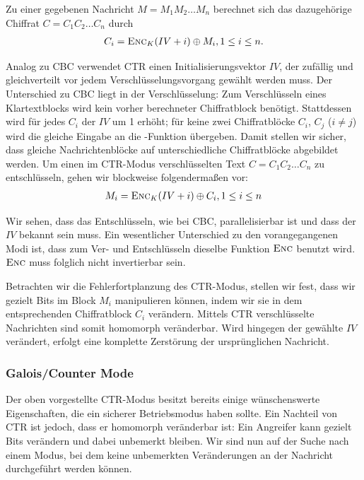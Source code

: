 Zu einer gegebenen Nachricht $M = M_1M_2 \dots M_n$ berechnet sich das dazugehörige Chiffrat $C = C_1C_2 \dots C_n$ durch
\begin{align*}
	C_i = \textsc{Enc}_{K}(IV + i) \oplus M_i{,}\, 1 \leq i \leq n.
\end{align*}

Analog zu CBC verwendet CTR einen Initialisierungsvektor $IV$, der zufällig und gleichverteilt vor jedem Verschlüsselungsvorgang gewählt werden muss. Der Unterschied zu CBC liegt in der Verschlüsselung: Zum Verschlüsseln eines Klartextblocks wird kein vorher berechneter Chiffratblock benötigt. Stattdessen wird für jedes $C_i$ der $IV$ um 1 erhöht; für keine zwei Chiffratblöcke $C_i$, $C_j$ ($i \neq j$) wird die gleiche Eingabe an die \enc-Funktion übergeben. Damit stellen wir sicher, dass gleiche Nachrichtenblöcke auf unterschiedliche Chiffratblöcke abgebildet werden. Um einen im CTR-Modus verschlüsselten Text $C = C_1C_2 \dots C_n$ zu entschlüsseln, gehen wir blockweise folgendermaßen vor:
\begin{align*}
	M_i = \textsc{Enc}_{K}(IV + i) \oplus C_i{,}\, 1 \leq i \leq n
\end{align*}

Wir sehen, dass das Entschlüsseln, wie bei CBC, parallelisierbar ist und dass der $IV$ bekannt sein muss. Ein wesentlicher Unterschied zu den vorangegangenen Modi ist, dass zum Ver- und Entschlüsseln dieselbe Funktion $\textsc{Enc}$ benutzt wird. $\textsc{Enc}$ muss folglich nicht invertierbar sein.

Betrachten wir die Fehlerfortplanzung des CTR-Modus, stellen wir fest, dass wir gezielt Bits im Block $M_i$ manipulieren können, indem wir sie in dem entsprechenden Chiffratblock $C_i$ verändern. Mittels CTR verschlüsselte Nachrichten sind somit homomorph veränderbar. Wird hingegen der gewählte $IV$ verändert, erfolgt eine komplette Zerstörung der ursprünglichen Nachricht. 

\subsubsection{Galois/Counter Mode}
Der oben vorgestellte CTR-Modus besitzt bereits einige wünschenswerte Eigenschaften, die ein sicherer Betriebsmodus haben sollte. Ein Nachteil von CTR ist jedoch, dass er homomorph veränderbar ist: Ein Angreifer kann gezielt Bits verändern und dabei unbemerkt bleiben. Wir sind nun auf der Suche nach einem Modus, bei dem keine unbemerkten Veränderungen an der Nachricht durchgeführt werden können.

